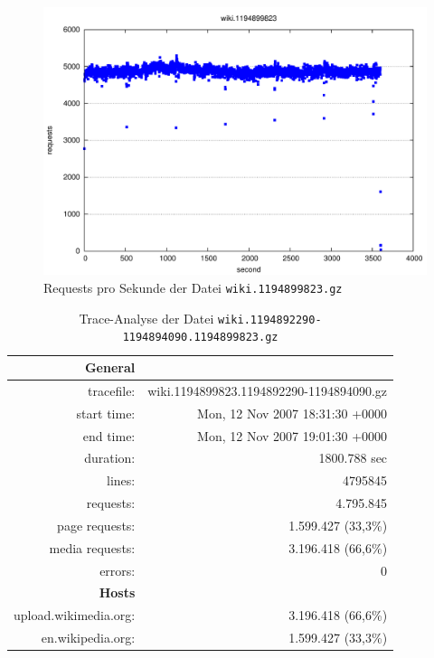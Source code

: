\begin{figure}
  \centering
  \includegraphics[width=\textwidth]{images/trace-full}
  \caption{Requests pro Sekunde der Datei \texttt{wiki.1194899823.gz}}
  \label{fig:trace-full}
\end{figure}

\begin{table}
  \centering
  \begin{tabular}{|rr|}\hline
    \textbf{General} & \\\hline
    tracefile: & wiki.1194899823.1194892290-1194894090.gz\\
    start time: & Mon, 12 Nov 2007 18:31:30 +0000\\
    end time: & Mon, 12 Nov 2007 19:01:30 +0000\\
    duration: & 1800.788 sec\\
    lines: & 4795845\\
    requests: & 4.795.845\\
    page requests: & 1.599.427 (33,3\%) \\
    media requests: & 3.196.418 (66,6\%) \\
    errors: & 0\\\hline\hline
    \textbf{Hosts} & \\\hline
    upload.wikimedia.org: & 3.196.418 (66,6\%) \\
    en.wikipedia.org: & 1.599.427 (33,3\%) \\\hline
  \end{tabular}
  \caption{Trace-Analyse der Datei \texttt{wiki.1194892290-1194894090.1194899823.gz}}
  \label{tab:trace-filtered}
\end{table}

